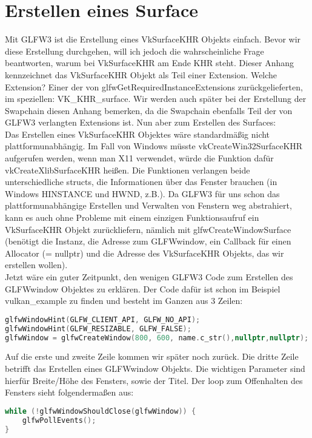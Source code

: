 \documentclass[11pt,a4paper]{report}
\begin{document}
\section{Erstellen eines Surface}
Mit GLFW3 ist die Erstellung eines VkSurfaceKHR Objekts einfach. Bevor wir diese Erstellung durchgehen, will ich jedoch die wahrscheinliche Frage beantworten, warum bei VkSurfaceKHR am Ende KHR steht. Dieser Anhang kennzeichnet das VkSurfaceKHR Objekt als Teil einer Extension. Welche Extension? Einer der von glfwGetRequiredInstanceExtensions zurückgelieferten, im speziellen: VK\_KHR\_surface. Wir werden auch später bei der Erstellung der Swapchain diesen Anhang bemerken, da die Swapchain ebenfalls Teil der von GLFW3 verlangten Extensions ist. Nun aber zum Erstellen des Surfaces:\\
Das Erstellen eines VkSurfaceKHR Objektes wäre standardmäßig nicht plattformunabhängig. Im Fall von Windows müsste vkCreateWin32SurfaceKHR aufgerufen werden, wenn man X11 verwendet, würde die Funktion dafür vkCreateXlibSurfaceKHR heißen. Die Funktionen verlangen beide unterschiedliche structs, die Informationen über das Fenster brauchen (in Windows HINSTANCE und HWND, z.B.). Da GLFW3 für uns schon das plattformunabhängige Erstellen und Verwalten von Fenstern weg abstrahiert, kann es auch ohne Probleme mit einem einzigen Funktionsaufruf ein VkSurfaceKHR Objekt zurückliefern, nämlich mit glfwCreateWindowSurface (benötigt die Instanz, die Adresse zum GLFWwindow, ein Callback für einen Allocator (= nullptr) und die Adresse des VkSurfaceKHR Objekts, das wir erstellen wollen).\\
Jetzt wäre ein guter Zeitpunkt, den wenigen GLFW3 Code zum Erstellen des GLFWwindow Objektes zu erklären. Der Code dafür ist schon im Beispiel vulkan\_example zu finden und besteht im Ganzen aus 3 Zeilen:
\begin{lstlisting}[language=C++]
glfwWindowHint(GLFW_CLIENT_API, GLFW_NO_API);
glfwWindowHint(GLFW_RESIZABLE, GLFW_FALSE);
glfwWindow = glfwCreateWindow(800, 600, name.c_str(),nullptr,nullptr);
\end{lstlisting}
Auf die erste und zweite Zeile kommen wir später noch zurück. Die dritte Zeile betrifft das Erstellen eines GLFWwindow Objekts. Die wichtigen Parameter sind hierfür Breite/Höhe des Fensters, sowie der Titel. Der loop zum Offenhalten des Fensters sieht folgendermaßen aus:
\begin{lstlisting}[language=C++]
while (!glfwWindowShouldClose(glfwWindow)) {
	glfwPollEvents();
}
\end{lstlisting}
\end{document}
